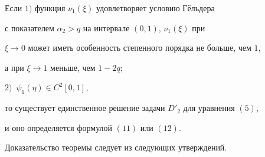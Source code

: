 \begin{thm}


Если $1)$ функция $\nu_1(\xi)$ удовлетворяет условию Г\"ельдера


с показателем $\alpha_2>q$ на интервале $(0,1)$,  $\nu_1(\xi)$ при


$\xi\to 0$ может иметь особенность степенного порядка не больше, чем $1$,


а при $\xi\to 1$ меньше, чем $1-2q;$  


$2)$~$\psi_1 (\eta)\in C^2[0,1]$, 


то существует единственное решение задачи $D'_2$ для уравнения $(5)$, 


и оно определяется формулой $(11)$ или $(12)$.


\end{thm}





Доказательство теоремы следует из следующих утверждений. 





